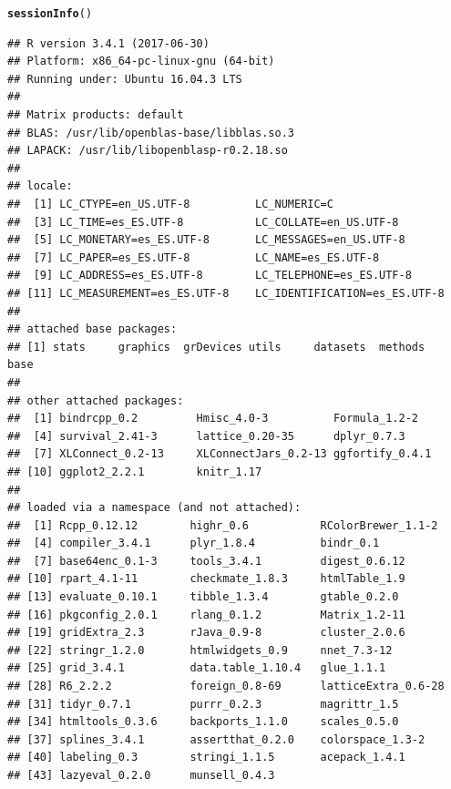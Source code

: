 \documentclass[12pt, a4paper]{article}\usepackage[]{graphicx}\usepackage[]{color}
\makeatletter
\newcommand{\hlstd}[1]{\textcolor[rgb]{0.345,0.345,0.345}{#1}}%
\newcommand{\hlkwd}[1]{\textcolor[rgb]{0.737,0.353,0.396}{\textbf{#1}}}%
\newenvironment{kframe}{%
 \def\at@end@of@kframe{}%
 \ifinner\ifhmode%
  \def\at@end@of@kframe{\end{minipage}}%
  \begin{minipage}{\columnwidth}%
 \fi\fi%
 \def\FrameCommand##1{\hskip\@totalleftmargin \hskip-\fboxsep
 \colorbox{shadecolor}{##1}\hskip-\fboxsep
     \hskip-\linewidth \hskip-\@totalleftmargin \hskip\columnwidth}%
 \MakeFramed {\advance\hsize-\width
   \@totalleftmargin\z@ \linewidth\hsize
   \@setminipage}}%
 {\par\unskip\endMakeFramed%
 \at@end@of@kframe}
\newenvironment{knitrout}{}{} %
\makeatother
\begin{document}
\begin{knitrout}
\color{fgcolor}\begin{kframe}
\begin{alltt}
\hlkwd{sessionInfo}\hlstd{()}
\end{alltt}
\begin{verbatim}
## R version 3.4.1 (2017-06-30)
## Platform: x86_64-pc-linux-gnu (64-bit)
## Running under: Ubuntu 16.04.3 LTS
## 
## Matrix products: default
## BLAS: /usr/lib/openblas-base/libblas.so.3
## LAPACK: /usr/lib/libopenblasp-r0.2.18.so
## 
## locale:
##  [1] LC_CTYPE=en_US.UTF-8          LC_NUMERIC=C                 
##  [3] LC_TIME=es_ES.UTF-8           LC_COLLATE=en_US.UTF-8       
##  [5] LC_MONETARY=es_ES.UTF-8       LC_MESSAGES=en_US.UTF-8      
##  [7] LC_PAPER=es_ES.UTF-8          LC_NAME=es_ES.UTF-8          
##  [9] LC_ADDRESS=es_ES.UTF-8        LC_TELEPHONE=es_ES.UTF-8     
## [11] LC_MEASUREMENT=es_ES.UTF-8    LC_IDENTIFICATION=es_ES.UTF-8
## 
## attached base packages:
## [1] stats     graphics  grDevices utils     datasets  methods   base     
## 
## other attached packages:
##  [1] bindrcpp_0.2         Hmisc_4.0-3          Formula_1.2-2       
##  [4] survival_2.41-3      lattice_0.20-35      dplyr_0.7.3         
##  [7] XLConnect_0.2-13     XLConnectJars_0.2-13 ggfortify_0.4.1     
## [10] ggplot2_2.2.1        knitr_1.17          
## 
## loaded via a namespace (and not attached):
##  [1] Rcpp_0.12.12        highr_0.6           RColorBrewer_1.1-2 
##  [4] compiler_3.4.1      plyr_1.8.4          bindr_0.1          
##  [7] base64enc_0.1-3     tools_3.4.1         digest_0.6.12      
## [10] rpart_4.1-11        checkmate_1.8.3     htmlTable_1.9      
## [13] evaluate_0.10.1     tibble_1.3.4        gtable_0.2.0       
## [16] pkgconfig_2.0.1     rlang_0.1.2         Matrix_1.2-11      
## [19] gridExtra_2.3       rJava_0.9-8         cluster_2.0.6      
## [22] stringr_1.2.0       htmlwidgets_0.9     nnet_7.3-12        
## [25] grid_3.4.1          data.table_1.10.4   glue_1.1.1         
## [28] R6_2.2.2            foreign_0.8-69      latticeExtra_0.6-28
## [31] tidyr_0.7.1         purrr_0.2.3         magrittr_1.5       
## [34] htmltools_0.3.6     backports_1.1.0     scales_0.5.0       
## [37] splines_3.4.1       assertthat_0.2.0    colorspace_1.3-2   
## [40] labeling_0.3        stringi_1.1.5       acepack_1.4.1      
## [43] lazyeval_0.2.0      munsell_0.4.3
\end{verbatim}
\end{kframe}
\end{knitrout}
\end{document}
